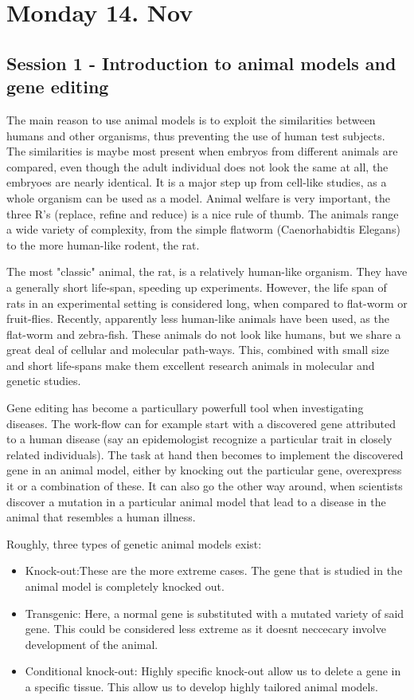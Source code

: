 \documentclass[12p]{article}
\begin{document}
\section*{Monday 14. Nov}

\subsection*{Session 1 - Introduction to animal models and gene editing}
The main reason to use animal models is to exploit the similarities between humans and other organisms, thus preventing the use of human test subjects.
The similarities is maybe most present when embryos from different animals are compared, even though the adult individual does not look the same at all, the embryoes are nearly identical.
It is a major step up from cell-like studies, as a whole organism can be used as a model.
Animal welfare is very important, the three R's (replace, refine and reduce) is a nice rule of thumb.
The animals range a wide variety of complexity, from the simple flatworm (Caenorhabidtis Elegans) to the more human-like rodent, the rat.

The most "classic" animal, the rat, is a relatively human-like organism.
They have a generally short life-span, speeding up experiments.
However, the life span of rats in an experimental setting is considered long, when compared to flat-worm or fruit-flies.
Recently, apparently less human-like animals have been used, as the flat-worm and zebra-fish.
These animals do not look like humans, but we share a great deal of cellular and molecular path-ways.
This, combined with small size and short life-spans make them excellent research animals in molecular and genetic studies.

Gene editing has become a particullary powerfull tool when investigating diseases.
The work-flow can for example start with a discovered gene attributed to a human disease (say an epidemologist recognize a particular trait in closely related individuals).
The task at hand then becomes to implement the discovered gene in an animal model, either by knocking out the particular gene, overexpress it or a combination of these.
It can also go the other way around, when scientists discover a mutation in a particular animal model that lead to a disease in the animal that resembles a human illness.

Roughly, three types of genetic animal models exist:

\begin{itemize}
\item
    Knock-out:These are the more extreme cases. 
    The gene that is studied in the animal model is completely knocked out.
\item
    Transgenic: Here, a normal gene is substituted with a mutated variety of said gene.
    This could be considered less extreme as it doesnt neccecary involve development of the animal.
\item
    Conditional knock-out: Highly specific knock-out allow us to delete a gene in a specific tissue.
    This allow us to develop highly tailored animal models.
\end{itemize}
\end{document}
